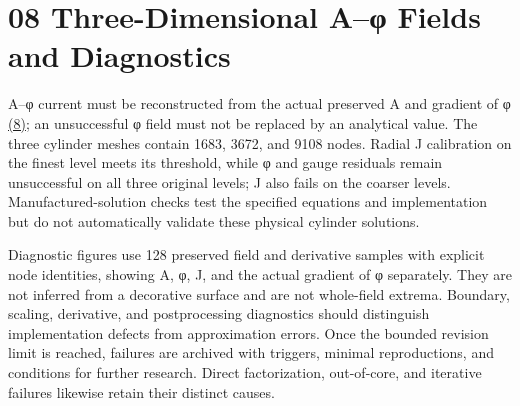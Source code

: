 \documentclass[11pt]{article}
\begin{document}
\section*{08 Three-Dimensional A–φ Fields and Diagnostics}
\hypertarget{chapter-08}{}
A–φ current must be reconstructed from the actual preserved A and gradient of φ \href{report_en_single.pdf#E07}{(8)}; an unsuccessful φ field must not be replaced by an analytical value. The three cylinder meshes contain 1683, 3672, and 9108 nodes. Radial J calibration on the finest level meets its threshold, while φ and gauge residuals remain unsuccessful on all three original levels; J also fails on the coarser levels. Manufactured-solution checks test the specified equations and implementation but do not automatically validate these physical cylinder solutions.


Diagnostic figures use 128 preserved field and derivative samples with explicit node identities, showing A, φ, J, and the actual gradient of φ separately. They are not inferred from a decorative surface and are not whole-field extrema. Boundary, scaling, derivative, and postprocessing diagnostics should distinguish implementation defects from approximation errors. Once the bounded revision limit is reached, failures are archived with triggers, minimal reproductions, and conditions for further research. Direct factorization, out-of-core, and iterative failures likewise retain their distinct causes.
\end{document}
